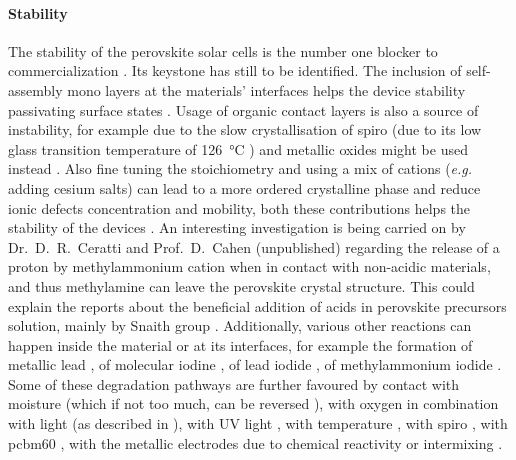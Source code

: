 	\paragraph{Stability}
	The stability of the perovskite solar cells is the number one blocker to commercialization \cite{Reyna2018}.
	Its keystone has still to be identified.
	The inclusion of self\hyp{}assembly mono layers at the materials' interfaces helps the device stability passivating surface states \cite{Lira-Cantu2017,Mingorance2018}.
	Usage of organic contact layers is also a source of instability, for example due to the slow crystallisation of \gls{spiro} \cite{Malinauskas2015} (due to its low glass transition temperature of \SI{126}{\celsius} \cite{Malinauskas2016}) and metallic oxides might be used instead \cite{Mingorance2018}.
	Also fine tuning the stoichiometry and using a mix of cations (\textsl{e.g.} adding cesium salts) can lead to a more ordered crystalline phase and reduce ionic defects concentration and mobility, both these contributions helps the stability of the devices \cite{Reyna2018}.
	An interesting investigation is being carried on by Dr.\ D.\ R.\ Ceratti and Prof.\ D.\ Cahen (unpublished) regarding the release of a proton by methylammonium cation when in contact with non-acidic materials, and thus methylamine can leave the perovskite crystal structure.
	This could explain the reports about the beneficial addition of acids in perovskite precursors solution, mainly by Snaith group \cite{Noel2017,Zhang2015a,Nayak2016}.
	Additionally, various other reactions can happen inside the material or at its interfaces, for example the formation of metallic lead \cite{Birkhold2018a,Sadoughi2015}, of molecular iodine \cite{Minns2017}, of lead iodide \cite{Buin2015,Walsh2015}, of methylammonium iodide \cite{Walsh2015}.
Some of these degradation pathways are further favoured by contact with moisture \cite{Jong2018,Schlipf2019,Hu2017,Han2015a} (which if not too much, can be reversed \cite{Leguy2015}), with oxygen in combination with light \cite{Senocrate2018a,Aristidou2017} (as described in ), with UV light \cite{Lee2016}, with temperature \cite{Philippe2015,Conings2015}, with \gls{spiro} \cite{Carrillo2016}, with \gls{pcbm60} \cite{DeBastiani2016}, with the metallic electrodes due to chemical reactivity \cite{Kato2015,Guerrero2016a,Back2016,Zhao2016,DeBastiani2016} or intermixing \cite{Domanski2016}.


